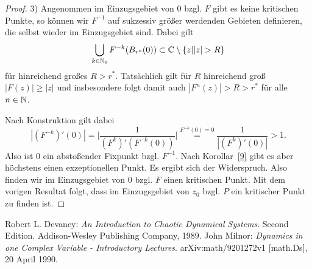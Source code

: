 \documentclass{mywork}
\begin{document}
\begin{proof}
3) Angenommen im Einzugsgebiet von $0$ bzgl. $F$ gibt es keine kritischen Punkte, so können wir $F^{-1}$ auf sukzessiv größer werdenden Gebieten definieren, die selbst wieder im Einzugsgebiet sind. Dabei gilt
\[
\bigcup_{k\in \N_0} F^{-k}(B_{r^*}(0))\subset \C\setminus \{z| |z|>R\}
\] 
für hinreichend großes $R>r^*$. Tatsächlich gilt für $R$  hinreichend groß $|F(z)| \ge |z|$ und insbesondere folgt damit auch $|F^n(z)|>R>r^*$ für alle $n\in \mathbb{N}$. 

Nach Konstruktion gilt dabei 
\[
|(F^{-k})'(0)|=\Bigg|\frac{1}{(F^k)'(F^{-k}(0))} \Bigg|\stackrel{F^{-k}(0)=0}= \frac{1}{|(F^k)'(0)|}>1.
\]
Also ist $0$ ein abstoßender Fixpunkt bzgl. $F^{-1}$. Nach Korollar~\ref{9} gibt es aber höchstens einen exzeptionellen Punkt. Es ergibt sich der Widerspruch. Also finden wir im Einzugsgebiet von $0$ bzgl. $F$ einen kritischen Punkt. Mit dem vorigen Resultat folgt, dass im Einzugsgebiet von $z_0$ bzgl. $P$ ein kritischer Punkt zu finden ist.
\end{proof}
\newpage
\begin{thebibliography}{tief}
 Robert L. Devaney: {\it An Introduction to Chaotic Dynamical Systems}. Second Edition.
                     Addison-Wesley Publishing Company, 1989.
 John Milnor: {\it Dynamics in one Complex Variable - Introductory Lectures}.  arXiv:math/9201272v1 [math.Ds], 20 April 1990.
\end{thebibliography} 
\end{document}

